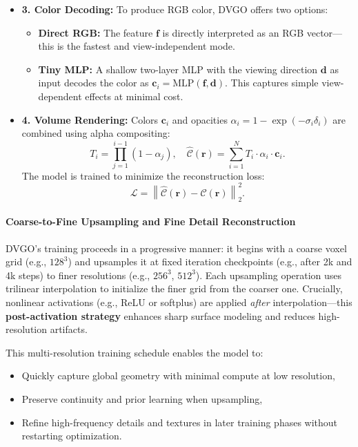 \begin{enrichment}
\begin{enrichment}
\begin{itemize}
        \item \textbf{3. Color Decoding:} To produce RGB color, DVGO offers two options:
        \begin{itemize}
            \item \textbf{Direct RGB:} The feature \( \mathbf{f} \) is directly interpreted as an RGB vector—this is the fastest and view-independent mode.
            \item \textbf{Tiny MLP:} A shallow two-layer MLP with the viewing direction \( \mathbf{d} \) as input decodes the color as \( \mathbf{c}_i = \text{MLP}(\mathbf{f}, \mathbf{d}) \). This captures simple view-dependent effects at minimal cost.
        \end{itemize}
        
        \item \textbf{4. Volume Rendering:} Colors \( \mathbf{c}_i \) and opacities \( \alpha_i = 1 - \exp(-\sigma_i \delta_i) \) are combined using alpha compositing:
        \[
        T_i = \prod_{j=1}^{i-1} (1 - \alpha_j), \quad \hat{\mathcal{C}}(\mathbf{r}) = \sum_{i=1}^{N} T_i \cdot \alpha_i \cdot \mathbf{c}_i.
        \]
        The model is trained to minimize the reconstruction loss:
        \[
        \mathcal{L} = \left\| \hat{\mathcal{C}}(\mathbf{r}) - \mathcal{C}(\mathbf{r}) \right\|_2^2.
        \]
    \end{itemize}
    
    \paragraph{Coarse-to-Fine Upsampling and Fine Detail Reconstruction}
    
    DVGO’s training proceeds in a progressive manner: it begins with a coarse voxel grid (e.g., \( 128^3 \)) and upsamples it at fixed iteration checkpoints (e.g., after 2k and 4k steps) to finer resolutions (e.g., \( 256^3 \), \( 512^3 \)). Each upsampling operation uses trilinear interpolation to initialize the finer grid from the coarser one. Crucially, nonlinear activations (e.g., ReLU or softplus) are applied \emph{after} interpolation—this \textbf{post-activation strategy} enhances sharp surface modeling and reduces high-resolution artifacts.
    
    This multi-resolution training schedule enables the model to:
    \begin{itemize}
        \item Quickly capture global geometry with minimal compute at low resolution,
        \item Preserve continuity and prior learning when upsampling,
        \item Refine high-frequency details and textures in later training phases without restarting optimization.
    \end{itemize}
    

\end{enrichment}
\end{enrichment}
